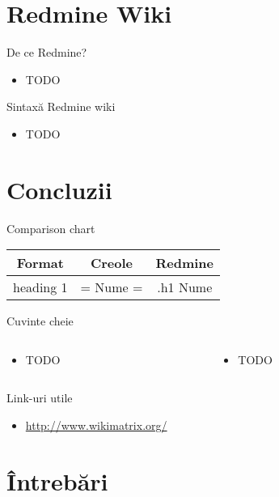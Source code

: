 \documentclass{beamer}
\begin{document}
\section{Redmine Wiki}

\frame{\tableofcontents[currentsection]}

\begin{frame}{De ce Redmine?}
  \begin{itemize}
    \item TODO
  \end{itemize}
\end{frame}

\begin{frame}{Sintaxă Redmine wiki}
  \begin{itemize}
    \item TODO
  \end{itemize}
\end{frame}


\section{Concluzii}

\frame{\tableofcontents[currentsection]}

\begin{frame}{Comparison chart}
  \begin{center}
    \begin{tabular}{|c|c|c|}
      \hline
      \textbf{Format} & \textbf{Creole} & \textbf{Redmine} \\
      \hline
      \hline
      heading 1 & = Nume = & .h1 Nume \\
      \hline
    \end{tabular}
  \end{center}
\end{frame}

\begin{frame}{Cuvinte cheie}
  \begin{columns}
    \begin{column}[l]{0.5\textwidth}
      \begin{itemize}
        \item TODO
      \end{itemize}
    \end{column}
    \begin{column}[l]{0.5\textwidth}
      \begin{itemize}
        \item TODO
      \end{itemize}
    \end{column}
  \end{columns}
\end{frame}

\begin{frame}{Link-uri utile}
  \begin{itemize}
    \item \url{http://www.wikimatrix.org/}
  \end{itemize}
\end{frame}


\section{\^{I}ntrebări}

\frame{\tableofcontents[currentsection]}
\end{document}
